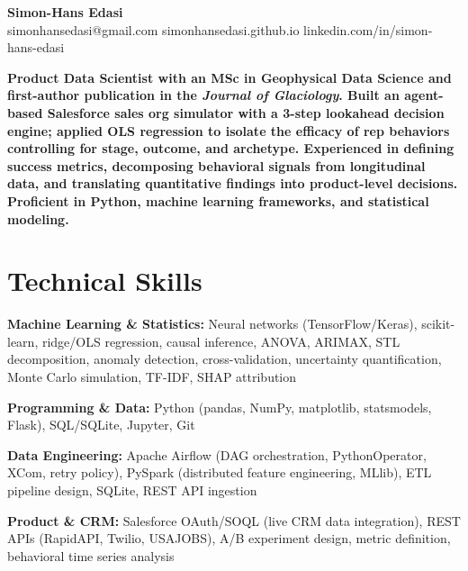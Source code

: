 \documentclass[11pt,a4paper]{article}
\begin{document}
\noindent{}

\begin{center}
    {\LARGE \textbf{Simon-Hans Edasi}} \\[6pt]
    simonhansedasi@gmail.com \hfill \textbar \hfill
    simonhansedasi.github.io \hfill \textbar \hfill
    linkedin.com/in/simon-hans-edasi
\end{center}

\vspace{0.3cm}

\noindent
\textbf{Product Data Scientist with an MSc in Geophysical Data Science and first-author publication in the \textit{Journal of Glaciology}. Built an agent-based Salesforce sales org simulator with a 3-step lookahead decision engine; applied OLS regression to isolate the efficacy of rep behaviors controlling for stage, outcome, and archetype. Experienced in defining success metrics, decomposing behavioral signals from longitudinal data, and translating quantitative findings into product-level decisions. Proficient in Python, machine learning frameworks, and statistical modeling.}

\section*{Technical Skills}

\noindent
\textbf{Machine Learning \& Statistics:} Neural networks (TensorFlow/Keras), scikit-learn, ridge/OLS regression, causal inference, ANOVA, ARIMAX, STL decomposition, anomaly detection, cross-validation, uncertainty quantification, Monte Carlo simulation, TF-IDF, SHAP attribution

\noindent
\textbf{Programming \& Data:} Python (pandas, NumPy, matplotlib, statsmodels, Flask), SQL/SQLite, Jupyter, Git

\noindent
\textbf{Data Engineering:} Apache Airflow (DAG orchestration, PythonOperator, XCom, retry policy), PySpark (distributed feature engineering, MLlib), ETL pipeline design, SQLite, REST API ingestion

\noindent
\textbf{Product \& CRM:} Salesforce OAuth/SOQL (live CRM data integration), REST APIs (RapidAPI, Twilio, USAJOBS), A/B experiment design, metric definition, behavioral time series analysis
\end{document}
